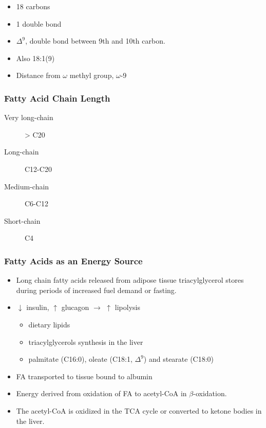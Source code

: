 \documentclass{scrartcl}
\begin{document}
\begin{itemize}
\item 18 carbons
\item 1 double bond
\item \(\Delta^{\text{9}}\), double bond between 9th and 10th carbon.
\item Also 18:1(9)
\item Distance from \(\omega\) methyl group, \(\omega\)-9
\end{itemize}

\subsubsection{Fatty Acid Chain Length}
\label{sec:orgbfebca9}

\begin{description}
\item[{Very long-chain}] > C20
\item[{Long-chain}] C12-C20
\item[{Medium-chain}] C6-C12
\item[{Short-chain}] C4
\end{description}

\subsubsection{Fatty Acids as an Energy Source}
\label{sec:org81f4802}

\begin{itemize}
\item Long chain fatty acids released from adipose tissue triacylglycerol
stores during periods of increased fuel demand or fasting.
\item \(\downarrow\) insulin, \(\uparrow\) glucagon \(\to\) \(\uparrow\) lipolysis
\begin{itemize}
\item dietary lipids
\item triacylglycerols synthesis in the liver
\item palmitate (C16:0), oleate (C18:1, \(\Delta^{\text{9}}\)) and stearate (C18:0)
\end{itemize}
\item FA transported to tissue bound to albumin
\item Energy derived from oxidation of FA to acetyl-CoA in \(\beta\)-oxidation.
\item The acetyl-CoA is oxidized in the TCA cycle or converted to ketone bodies in the liver.
\end{itemize}
\end{document}
